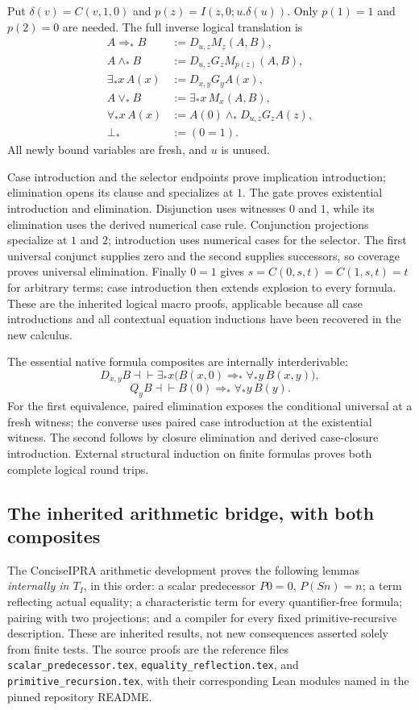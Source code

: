 Put $\delta(v)=C(v,1,0)$ and $p(z)=I(z,0;u.\delta(u))$.  Only
$p(1)=1$ and $p(2)=0$ are needed.  The full inverse logical translation is
\[
\begin{aligned}
 A\Rightarrow_*B&:=D_{u,z}M_z(A,B),\\
 A\wedge_*B&:=D_{u,z}G_zM_{p(z)}(A,B),\\
 \exists_*x\,A(x)&:=D_{x,y}G_yA(x),\\
 A\vee_*B&:=\exists_*x\,M_x(A,B),\\
 \forall_*x\,A(x)&:=A(0)\wedge_*D_{u,z}G_zA(z),\\
 \bot_*&:=(0=1).
\end{aligned}
\]
All newly bound variables are fresh, and $u$ is unused.

Case introduction and the selector endpoints prove implication
introduction; elimination opens its clause and specializes at $1$.
The gate proves existential introduction and elimination.  Disjunction
uses witnesses $0$ and $1$, while its elimination uses the derived
numerical case rule.  Conjunction projections specialize at $1$ and
$2$; introduction uses numerical cases for the selector.  The first
universal conjunct supplies zero and the second supplies successors,
so coverage proves universal elimination.  Finally $0=1$ gives
$s=C(0,s,t)=C(1,s,t)=t$ for arbitrary terms; case introduction then
extends explosion to every formula.  These are the inherited logical
macro proofs, applicable because all case introductions and all
contextual equation inductions have been recovered in the new calculus.

The essential native formula composites are internally interderivable:
\[
 D_{x,y}B\dashv\vdash
 \exists_*x\bigl(B(x,0)\Rightarrow_*\forall_*y\,B(x,y)\bigr),
\]
\[
 Q_yB\dashv\vdash B(0)\Rightarrow_*\forall_*y\,B(y).
\]
For the first equivalence, paired elimination exposes the conditional
universal at a fresh witness; the converse uses paired case introduction
at the existential witness.  The second follows by closure elimination
and derived case-closure introduction.  External structural induction
on finite formulas proves both complete logical round trips.

\subsection{The inherited arithmetic bridge, with both composites}
The ConciseIPRA arithmetic development proves the following lemmas~\cite{bridge,readme}
\emph{internally in $T_I$}, in this order: a scalar predecessor
$P0=0$, $P(Sn)=n$; a term reflecting actual equality; a characteristic
term for every quantifier-free formula; pairing with two projections;
and a compiler for every fixed primitive-recursive description.  These
are inherited results, not new consequences asserted solely from
finite tests.  The source proofs are the reference files
\texttt{scalar\_predecessor.tex}, \texttt{equality\_reflection.tex}, and
\texttt{primitive\_recursion.tex}, with their corresponding Lean
modules named in the pinned repository README.

